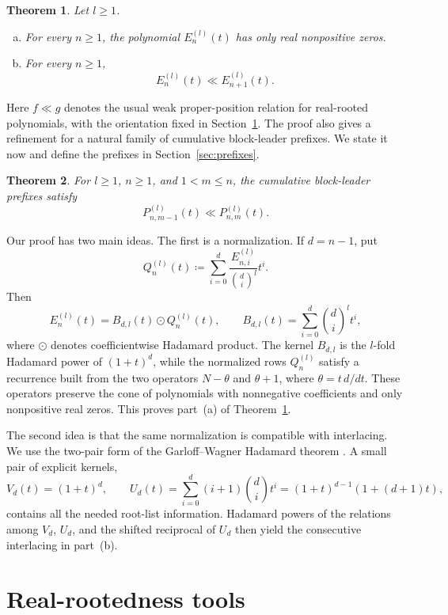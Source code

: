 \documentclass[reqno]{amsart}
\numberwithin{equation}{section}
\newtheorem{theorem}{Theorem}[section]
\theoremstyle{definition}
\newcommand{\had}{\odot}
\begin{document}
\begin{theorem}
\label{thm:main}
Let $l\geq 1$.
\begin{enumerate}[(a)]
\item For every $n\geq 1$, the polynomial $E_n^{(l)}(t)$ has only real
  nonpositive zeros.
\item For every $n\geq 1$,
  \[
    E_n^{(l)}(t)\ll E_{n+1}^{(l)}(t).
  \]
\end{enumerate}
\end{theorem}

Here $f\ll g$ denotes the usual weak proper-position relation for real-rooted
polynomials, with the orientation fixed in Section~\ref{sec:tools}.  The proof
also gives a refinement for a natural family of cumulative block-leader
prefixes.  We state it now and define the prefixes in
Section~\ref{sec:prefixes}.

\begin{theorem}
\label{thm:prefixChainIntro}
For $l\geq 1$, $n\geq 1$, and $1<m\leq n$, the cumulative block-leader
prefixes satisfy
\[
  P_{n,m-1}^{(l)}(t)\ll P_{n,m}^{(l)}(t).
\]
\end{theorem}

Our proof has two main ideas.  The first is a normalization.  If $d=n-1$, put
\[
  Q_n^{(l)}(t)
  \coloneqq
  \sum_{i=0}^{d}
  \frac{E_{n,i}^{(l)}}{\binom di^l}t^i .
\]
Then
\[
  E_n^{(l)}(t)=B_{d,l}(t)\had Q_n^{(l)}(t),
  \qquad
  B_{d,l}(t)=\sum_{i=0}^{d}\binom di^l t^i ,
\]
where $\had$ denotes coefficientwise Hadamard product.  The kernel
$B_{d,l}$ is the $l$-fold Hadamard power of $(1+t)^d$, while the normalized
rows $Q_n^{(l)}$ satisfy a recurrence built from the two operators
$N-\theta$ and $\theta+1$, where $\theta=t\,d/dt$.  These operators preserve
the cone of polynomials with nonnegative coefficients and only nonpositive
real zeros.  This proves part~(a) of Theorem~\ref{thm:main}.

The second idea is that the same normalization is compatible with interlacing.
We use the two-pair form of the Garloff--Wagner Hadamard theorem
\cite[Thm.~4]{GarloffWagner1996}.  A small pair of explicit kernels,
\[
  V_d(t)=(1+t)^d,\qquad
  U_d(t)=\sum_{i=0}^{d}(i+1)\binom di t^i
        =(1+t)^{d-1}(1+(d+1)t),
\]
contains all the needed root-list information.  Hadamard powers of the
relations among $V_d$, $U_d$, and the shifted reciprocal of $U_d$ then yield
the consecutive interlacing in part~(b).

\section{Real-rootedness tools}
\label{sec:tools}
\end{document}
